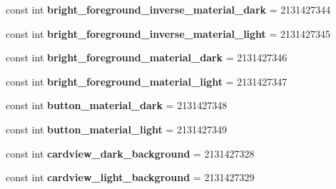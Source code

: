 \begin{DoxyCompactItemize}
\item 
\mbox{\label{class_pinned_app_1_1_droid_1_1_resource_1_1_color_a64e513689c76316acd76725aa6e1fd20}} 
const int {\bfseries bright\+\_\+foreground\+\_\+inverse\+\_\+material\+\_\+dark} = 2131427344
\item 
\mbox{\label{class_pinned_app_1_1_droid_1_1_resource_1_1_color_a8310312f55fde89e71f2903cbf0d37e8}} 
const int {\bfseries bright\+\_\+foreground\+\_\+inverse\+\_\+material\+\_\+light} = 2131427345
\item 
\mbox{\label{class_pinned_app_1_1_droid_1_1_resource_1_1_color_afa4bf8fccec9fbe08d85c915f70ca32a}} 
const int {\bfseries bright\+\_\+foreground\+\_\+material\+\_\+dark} = 2131427346
\item 
\mbox{\label{class_pinned_app_1_1_droid_1_1_resource_1_1_color_adde8f59832836560916c5a410e8ddbc9}} 
const int {\bfseries bright\+\_\+foreground\+\_\+material\+\_\+light} = 2131427347
\item 
\mbox{\label{class_pinned_app_1_1_droid_1_1_resource_1_1_color_a664e05d1609b68d9dc16169b6233babe}} 
const int {\bfseries button\+\_\+material\+\_\+dark} = 2131427348
\item 
\mbox{\label{class_pinned_app_1_1_droid_1_1_resource_1_1_color_a39162cee67ae7e911490843efec03d6d}} 
const int {\bfseries button\+\_\+material\+\_\+light} = 2131427349
\item 
\mbox{\label{class_pinned_app_1_1_droid_1_1_resource_1_1_color_ad3a2a402ed1e10fadcba8594398d26c0}} 
const int {\bfseries cardview\+\_\+dark\+\_\+background} = 2131427328
\item 
\mbox{\label{class_pinned_app_1_1_droid_1_1_resource_1_1_color_a1dbb5273eae4228c1ed5da108d5eb4ab}} 
const int {\bfseries cardview\+\_\+light\+\_\+background} = 2131427329
\item 

\end{DoxyCompactItemize}
